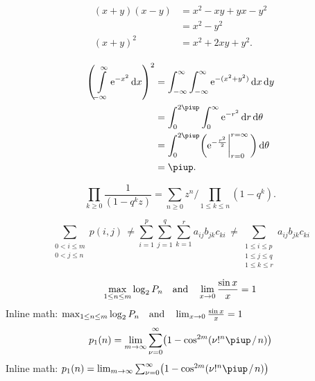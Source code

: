 \documentclass[11pt, a4paper, oneside]{article}
\newcommand{\mathup}[1]{\mathrm{#1}}
\newcommand*{\divslash}{%
	\mathbin{%
		\nonscript\mskip-2mu / \nonscript\mskip-2mu%
	}%
}  %
\theoremstyle{Plain}
\theoremstyle{Definition}
\theoremstyle{Remark}
\begin{document}
\begin{appendix}

	\begin{align*}
	\begin{aligned}
	(x+y)(x-y)&=x^2-xy+yx-y^2\\
	&=x^2-y^2\\
	(x+y)^2&=x^2+2xy+y^2.
	\end{aligned}
	\end{align*}


	\begin{align*}
	\begin{aligned}
	\left( \int\limits_{-\infty}^\infty \mathup{e}^{-x^2}\,\mathup{d}x \right)^2
	&=\int_{-\infty}^\infty\int_{-\infty}^\infty \mathup{e}^{-(x^2+y^2)}\,\mathup{d}x\,\mathup{d}y\\
	&=\int_0^{2\piup}\int_0^\infty \mathup{e}^{-r^2}\,\mathup{d}r\,\mathup{d}\theta\\
	&=\int_0^{2\piup}\biggl(\mathup{e}^{-\frac{r^2}{2}}\biggl|_{r=0}^{r=\infty}\,\biggr)\,\mathup{d}\theta\\
	&=\piup.
	\end{aligned}
	\end{align*}



	$$\prod_{k\ge0}\frac{1}{(1-q^kz)}=
	\sum_{n\ge0}z^n \bigg/ \!\!\prod_{1\le k\le n}(1-q^k).$$

	$$\sum_{\substack{\scriptstyle 0< i\le m\\\scriptstyle0<j\le n}}p(i,j) \,\ne
	\sum_{i=1}^p \sum_{j=1}^q \sum_{k=1}^r a_{ij} b_{jk} c_{ki} \,\ne
	\sum_{\substack{\scriptstyle 1\le i\le p \\ \scriptstyle 1\le j\le q\\
			\scriptstyle 1\le k\le r}} a_{ij} b_{jk} c_{ki}$$

	$$\max_{1\le n\le m}\log_2P_n \quad \hbox{and} \quad
	\lim_{x\to0}\frac{\sin x}{x}=1$$
	Inline math:
	$\max_{1\le n\le m}\log_2P_n \quad \hbox{and} \quad
	\lim_{x\to0}\frac{\sin x}{x}=1$
	$$p_1(n)=\lim_{m\to\infty}\sum_{\nu=0}^\infty\bigl(1-\cos^{2m}(\nu!^n\piup \divslash n)\bigr)$$
	Inline math:
	$p_1(n)=\lim_{m\to\infty}\sum_{\nu=0}^\infty\bigl(1-\cos^{2m}(\nu!^n\piup \divslash n)\bigr)$


\end{appendix}
\end{document}
